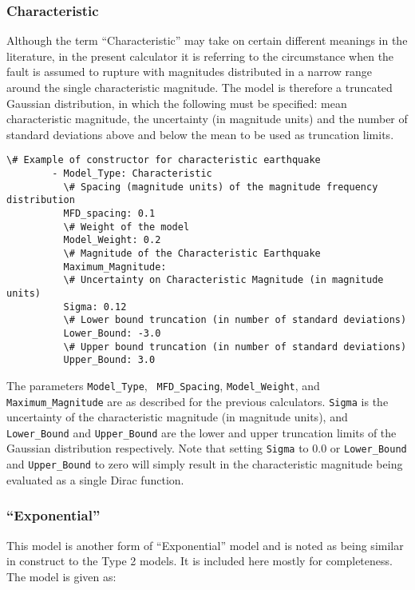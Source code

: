 \subsubsection{Characteristic}

Although the term ``Characteristic'' may take on certain different meanings in the literature, in the present calculator it is referring to the circumstance when the fault is assumed to rupture with magnitudes distributed in a narrow range around the single characteristic magnitude. The model is therefore a truncated Gaussian distribution, in which the following must be specified: mean characteristic magnitude, the uncertainty (in magnitude units) and the number of standard deviations above and below the mean to be used as truncation limits.

\begin{Verbatim}[frame=single, commandchars=\\\{\}, fontsize=\scriptsize]
          \# Example of constructor for characteristic earthquake
        - Model_Type: Characteristic
          \# Spacing (magnitude units) of the magnitude frequency distribution
          MFD_spacing: 0.1
          \# Weight of the model
          Model_Weight: 0.2
          \# Magnitude of the Characteristic Earthquake
          Maximum_Magnitude:
          \# Uncertainty on Characteristic Magnitude (in magnitude units)
          Sigma: 0.12
          \# Lower bound truncation (in number of standard deviations)
          Lower_Bound: -3.0
          \# Upper bound truncation (in number of standard deviations)
          Upper_Bound: 3.0
\end{Verbatim}

The parameters \verb=Model_Type=, \verb= MFD_Spacing=, \verb=Model_Weight=, and\verb= Maximum_Magnitude= are as described for the previous calculators. \verb=Sigma= is the uncertainty of the characteristic magnitude (in magnitude units), and \verb=Lower_Bound= and \verb=Upper_Bound= are the lower and upper truncation limits of the Gaussian distribution respectively. Note that setting \verb=Sigma= to 0.0 or \verb=Lower_Bound= and \verb=Upper_Bound= to zero will simply result in the characteristic magnitude being evaluated as a single Dirac function.


\subsubsection{\cite{YoungsCoppersmith1985} ``Exponential''}

This model is another form of ``Exponential'' model and is noted as being similar in construct to the \cite{AndersonLuco1983} Type 2 models. It is included here mostly for completeness. The model is given as:

